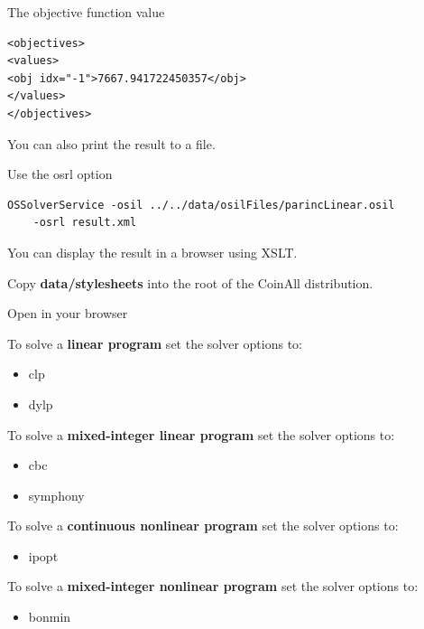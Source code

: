 \documentclass[11pt]{article}
\renewcommand{\_}{{\char"5F}}
\renewcommand{\{}{{\char"7B}}
\renewcommand{\}}{{\char"7D}}
\renewcommand{\^}{{\char"0D}}
\renewcommand{\'}{{\char"0D}}
\begin{document}
\vfill

The objective function value

\vfill

\begin{verbatim}
<objectives>
<values>
<obj idx="-1">7667.941722450357</obj>
</values>
</objectives>
\end{verbatim}



You can also print the result to a file.  

\vfill

Use the osrl option
\vfill

{\small
\begin{verbatim}
OSSolverService -osil ../../data/osilFiles/parincLinear.osil 
    -osrl result.xml
\end{verbatim}
}

\vfill
You can display the result in a browser using XSLT.

\vfill

Copy {\bf data/stylesheets} into the root of the CoinAll distribution. 

\vfill
Open in your browser






To solve a {\bf linear program} set the solver options to:

\begin{itemize}
\vfill \item clp

\vfill \item dylp
\end{itemize}


To solve a {\bf mixed-integer linear program} set the solver options to:

\begin{itemize}
\vfill \item cbc

\vfill \item symphony
\end{itemize}


To solve a {\bf continuous nonlinear program} set the solver options to:

\begin{itemize}
\vfill \item ipopt
\end{itemize}


To solve a {\bf mixed-integer nonlinear program} set the solver options to:

\begin{itemize}
\vfill \item bonmin
\end{itemize}
\end{document}
